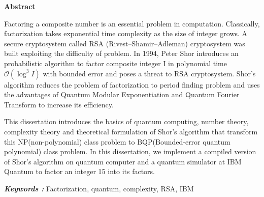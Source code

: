 \begin{center}
	\textbf{\textbf{\fontsize{16pt}{24pt}\selectfont Abstract}}
\end{center}
Factoring a composite number is an essential problem in computation. Classically, factorization takes exponential time complexity as the size of integer grows. A secure cryptosystem called RSA (Rivest–Shamir–Adleman) cryptosystem was built exploiting the difficulty of problem. In 1994, Peter Shor introduces an probabilistic algorithm to factor composite integer I in polynomial time $\mathcal{O} (\log^3 I)$ with bounded error and poses a threat to RSA cryptosystem. Shor's algorithm reduces the problem of factorization to period finding problem and uses the advantages of Quantum Modular Exponentiation and Quantum Fourier Transform to increase its efficiency. \par

This dissertation introduces the basics of quantum computing, number theory, complexity theory and theoretical formulation of Shor's algorithm that transform this NP(non-polynomial) class problem to BQP(Bounded-error quantum polynomial) class problem. In this dissertation, we implement a compiled version of Shor's algorithm on quantum computer and a quantum simulator at IBM Quantum to factor an integer 15 into its factors. \par

\textbf{\textit{Keywords : }} Factorization, quantum, complexity, RSA, IBM
